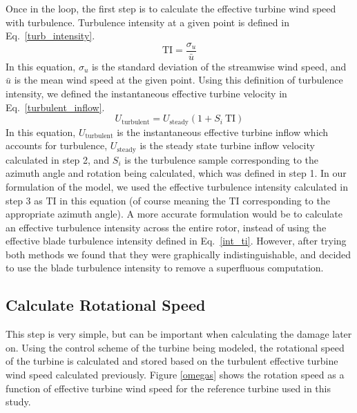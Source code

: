 \documentclass[11pt,letterpaper]{article}
\begin{document}
Once in the loop, the first step is to calculate the effective turbine wind speed with turbulence. Turbulence intensity at a given point is defined in Eq.~\ref{turb_intensity}.
%
\begin{equation}
    \label{turb_intensity}
    \text{TI} = \frac{\sigma_u}{\bar{u}}
\end{equation}
% 
In this equation, $\sigma_u$ is the standard deviation of the streamwise wind speed, and $\bar{u}$ is the mean wind speed at the given point. Using this definition of turbulence intensity, we defined the instantaneous effective turbine velocity in Eq.~\ref{turbulent_inflow}.
%
\begin{equation}
    \label{turbulent_inflow}
    U_{\text{turbulent}} = U_{\text{steady}}(1 + S_i ~\text{TI})
\end{equation}
% 
In this equation, $U_{\text{turbulent}}$ is the instantaneous effective turbine inflow which accounts for turbulence, $U_{\text{steady}}$ is the steady state turbine inflow velocity calculated in step 2, and $S_i$ is the turbulence sample corresponding to the azimuth angle and rotation being calculated, which was defined in step 1. In our formulation of the model, we used the effective turbulence intensity calculated in step 3 as $\text{TI}$ in this equation (of course meaning the $\text{TI}$ corresponding to the appropriate azimuth angle). A more accurate formulation would be to calculate an effective turbulence intensity across the entire rotor, instead of using the effective blade turbulence intensity defined in Eq.~\ref{int_ti}. However, after trying both methods we found that they were graphically indistinguishable, and decided to use the blade turbulence intensity to remove a superfluous computation. 

\subsection{Calculate Rotational Speed}
This step is very simple, but can be important when calculating the damage later on. Using the control scheme of the turbine being modeled, the rotational speed of the turbine is calculated and stored based on the turbulent effective turbine wind speed calculated previously. Figure \ref{omegas} shows the rotation speed as a function of effective turbine wind speed for the reference turbine used in this study. 
\end{document}
